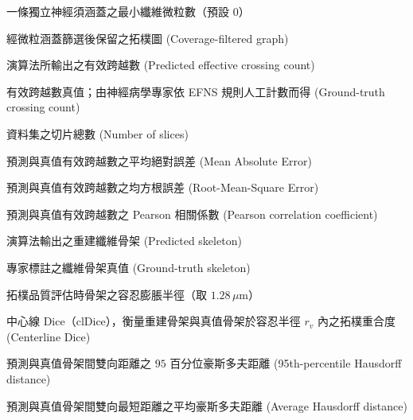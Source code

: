 \begin{denotation}[3cm]
\item[$N_{\min}$]{
  一條獨立神經須涵蓋之最小纖維微粒數（預設 $0$）
}

\item[$G_{\text{cov}}$]{
  經微粒涵蓋篩選後保留之拓樸圖 (Coverage-filtered graph)
}

\item[$N_{\text{pred}}$]{
  演算法所輸出之有效跨越數 (Predicted effective crossing count)
}

\item[$N_{\text{gt}}$]{
  有效跨越數真值；由神經病學專家依 EFNS 規則人工計數而得 (Ground-truth crossing count)
}

\item[$K$]{
  資料集之切片總數 (Number of slices)
}

\item[$N_{\text{MAE}}$]{
  預測與真值有效跨越數之平均絕對誤差 (Mean Absolute Error)
}

\item[$N_{\text{RMSE}}$]{
  預測與真值有效跨越數之均方根誤差 (Root-Mean-Square Error)
}

\item[$\rho$]{
  預測與真值有效跨越數之 Pearson 相關係數 (Pearson correlation coefficient)
}

\item[$S_{\text{pred}}$]{
  演算法輸出之重建纖維骨架 (Predicted skeleton)
}

\item[$S_{\text{gt}}$]{
  專家標註之纖維骨架真值 (Ground-truth skeleton)
}

\item[$r_{v}$]{
  拓樸品質評估時骨架之容忍膨脹半徑（取 $1.28\,\mu\text{m}$）
}

\item[$\text{Dice}_{\text{cl}}$]{
  中心線 Dice（clDice），衡量重建骨架與真值骨架於容忍半徑 $r_{v}$ 內之拓樸重合度 (Centerline Dice)
}

\item[$\text{HD95}$]{
  預測與真值骨架間雙向距離之 $95$ 百分位豪斯多夫距離 (95th-percentile Hausdorff distance)
}

\item[$\text{HD}_{\text{avg}}$]{
  預測與真值骨架間雙向最短距離之平均豪斯多夫距離 (Average Hausdorff distance)
}

\end{denotation}
